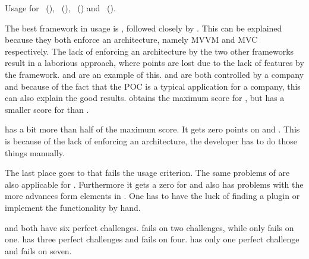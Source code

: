 \documentclass[a4paper]{artikel3}
\begin{document}
\begin{table}
\centering
\resizebox{\columnwidth}{!} {
}
\caption{Usage for \st{}~(\sta), \kendo{}~(\kendoa), \jqm{}~(\jqma) and \lungo{}~(\lungoa).}
\label{tabel:evaluatie-usage}
\end{table}

The best framework in usage is \kendob{}, followed closely by \sta{}.
This can be explained because they both enforce an architecture, namely MVVM and MVC respectively.
The lack of enforcing an architecture by the two other frameworks result in a laborious approach, where points are lost due to the lack of features by the framework.
 and  are an example of this.
\kendob{} and \sta{} are both controlled by a company and because of the fact that the POC is a typical application for a company, this can also explain the good results.
\kendob{} obtains the maximum score for , but has a smaller score for  than \sta.

\jqma{} has a bit more than half of the maximum score.
It gets zero points on  and .
This is because of the lack of enforcing an architecture, the developer has to do those things manually. 

The last place goes to \lungo{} that fails the usage criterion.
The same problems of \jqma{} are also applicable for \lungo{}.
Furthermore it gets a zero for  and also has problems with the more advances form elements in .
One has to have the luck of finding a plugin or implement the functionality by hand.

\kendob{} and \sta{} both have six perfect challenges.
\kendob{} fails on two challenges, while \sta{} only fails on one.
\jqm{} has three perfect challenges and fails on four.
\lungo{} has only one perfect challenge and fails on seven.
\end{document}
